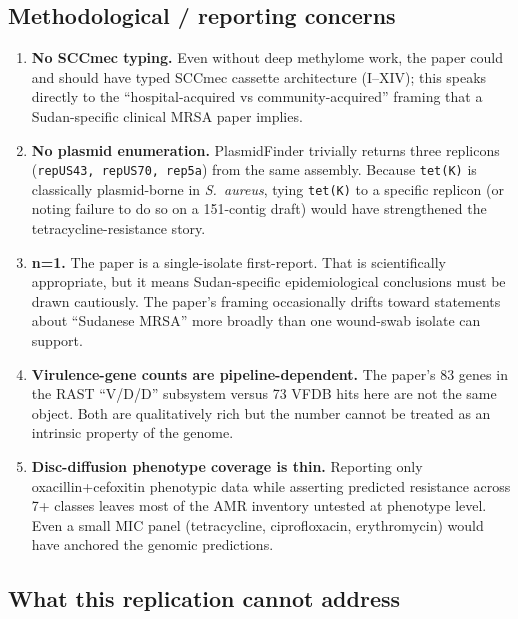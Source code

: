 \documentclass[11pt]{article}
\begin{document}
\subsection*{Methodological / reporting concerns}

\begin{enumerate}[leftmargin=1.5em, resume]
\item \textbf{No SCCmec typing.} Even without deep methylome work, the paper
could and should have typed SCCmec cassette architecture (I--XIV);
this speaks directly to the ``hospital-acquired vs community-acquired''
framing that a Sudan-specific clinical MRSA paper implies.

\item \textbf{No plasmid enumeration.} PlasmidFinder trivially returns
three replicons (\texttt{repUS43, repUS70, rep5a}) from the same
assembly. Because \texttt{tet(K)} is classically plasmid-borne in
\emph{S.\ aureus}, tying \texttt{tet(K)} to a specific replicon
(or noting failure to do so on a 151-contig draft) would have
strengthened the tetracycline-resistance story.

\item \textbf{n=1.} The paper is a single-isolate first-report. That is
scientifically appropriate, but it means Sudan-specific epidemiological
conclusions must be drawn cautiously. The paper's framing occasionally
drifts toward statements about ``Sudanese MRSA'' more broadly than
one wound-swab isolate can support.

\item \textbf{Virulence-gene counts are pipeline-dependent.} The paper's
83 genes in the RAST ``V/D/D'' subsystem versus 73 VFDB hits here
are not the same object. Both are qualitatively rich but the
number cannot be treated as an intrinsic property of the genome.

\item \textbf{Disc-diffusion phenotype coverage is thin.} Reporting only
oxacillin+cefoxitin phenotypic data while asserting predicted resistance
across 7+ classes leaves most of the AMR inventory untested at
phenotype level. Even a small MIC panel (tetracycline, ciprofloxacin,
erythromycin) would have anchored the genomic predictions.
\end{enumerate}

\subsection*{What this replication cannot address}
\end{document}
